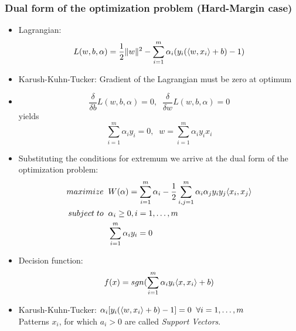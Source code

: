 \documentclass{scrartcl}
\newcommand{\ffrac}[2]{\ensuremath{\frac{\displaystyle #1}{\displaystyle #2}}}
\DeclarePairedDelimiter\norm{\lVert}{\rVert}%
\DeclarePairedDelimiter\inner{\langle}{\rangle}%
\begin{document}
\subsubsection{Dual form of the optimization problem (Hard-Margin case)}
\begin{itemize}
    \item
        Lagrangian:
        $$L(w,b,\alpha) = \ffrac{1}{2}\norm{w}^2-\sum_{i=1}^{m}\alpha_i(y_i(\inner{w,x_i}+b)-1)$$
    \item
        Karush-Kuhn-Tucker: Gradient of the Lagrangian must be zero at optimum
    \item
        $$\ffrac{\delta}{\delta b}L(w,b,\alpha) = 0, \;\; \ffrac{\delta}{\delta w}L(w,b,\alpha) = 0$$
        yields
        $$\sum_{i=1}^{m}\alpha_i y_i = 0, \;\; w = \sum_{i=1}^{m}\alpha_i y_i x_i$$
    \item
        Substituting the conditions for extremum we arrive at the dual form of the optimization problem:
        \begin{align*}
            maximize \; \; & W(\alpha) = \sum_{i=1}^{m}\alpha_i - \ffrac{1}{2}\sum_{i,j=1}^{m}\alpha_i \alpha_j y_i y_j \inner{x_i,x_j}\\
            subject \; to \; \; & \alpha_i \geq 0, i=1,\dots,m \\%
            & \sum_{i=1}^{m} \alpha_i y_i = 0
        \end{align*}
    \item
        Decision function:
        $$f(x) = sgn(\sum_{i=1}^{m}\alpha_i y_i \inner{x,x_i}+b)$$
    \item
        Karush-Kuhn-Tucker: $\alpha_i[y_i(\inner{w,x_i}+b)-1]=0 \;\;\forall i=1,\dots ,m$\\
        Patterns $x_i$, for which $a_i > 0$ are called \textit{Support Vectors}.
\end{itemize}
\end{document}
